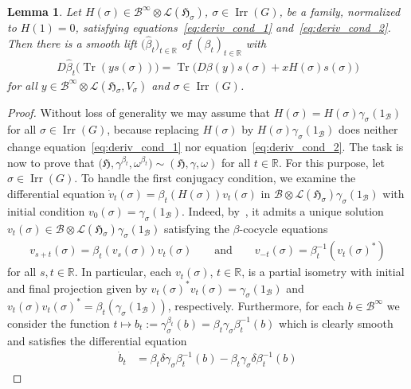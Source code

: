 \documentclass[pdftex]{sigma}
\numberwithin{equation}{section}
\newtheorem{Lemma}[Theorem]{Lemma}
\newcommand*{\R}{\mathbb R}		%
\newcommand*{\tensor}{\otimes}		%
\DeclareMathOperator{\Tr}{Tr}		%
\newcommand*{\hilb}{\mathfrak}		%
\newcommand*{\alg}{\mathcal}		%
\newcommand*{\hH}{\hilb{H}}			%
\newcommand*{\one}{1}				%
\newcommand*{\aB}{\alg{B}} 			%
\newcommand*{\End}{\mathcal{L}} %
\DeclareMathOperator{\Irrep}{Irr} 			%
\begin{document}
\begin{Lemma}\label{lem:H_to_1_param}
	Let $H(\sigma) \in \aB^\infty \tensor \End(\hH_\sigma)$, $\sigma \in \Irrep(G)$, be a family, normalized to $H(1) = 0$, satisfying equations~\eqref{eq:deriv_cond_1} and~\eqref{eq:deriv_cond_2}.
	Then there is a smooth lift $\big(\hat \beta_t\big)_{t \in \R}$ of $(\beta_t)_{t \in \R}$ with
	\begin{gather*}
		D\hat \beta_t \bigl( \Tr ( y s(\sigma) ) \bigr) = \Tr \bigl( D\beta(y) s(\sigma) + x H(\sigma) s(\sigma) \bigr)
	\end{gather*}
	for all $y \in \aB^\infty \tensor \End(\hH_\sigma, V_\sigma)$ and $\sigma \in \Irrep(G)$.
\end{Lemma}
\begin{proof}
	Without loss of generality we may assume that $H(\sigma) = H(\sigma) \gamma_\sigma(\one_\aB)$ for all $\sigma \in \Irrep(G)$, because replacing $H(\sigma)$ by $H(\sigma) \gamma_\sigma(\one_\aB)$ does neither change equation~\eqref{eq:deriv_cond_1} nor equation~\eqref{eq:deriv_cond_2}.
	The task is now to prove that $\big(\hH, \gamma^{\beta_t}, \omega^{\beta_t}\big) \sim (\hH, \gamma, \omega)$ for all $t \in \R$.
	For this purpose, let $\sigma \in \Irrep(G)$.
	To handle the first conjugacy condition, we examine the differential equation $\dot v_t(\sigma) = \beta_t ( H(\sigma) ) v_t(\sigma)$ in $\aB \tensor \End(\hH_\sigma) \gamma_\sigma(\one_\aB)$ with initial condition $v_0(\sigma) = \gamma_\sigma(\one_\aB)$.
	Indeed, by~\cite[Section~3]{daleckii02}, it admits a unique solution $v_t(\sigma) \in \aB \tensor \End(\hH_\sigma) \gamma_\sigma(\one_\aB)$ satisfying the $\beta$-cocycle equations
	\begin{gather}\label{eq:proof_1_cocycle}
		v_{s+t}(\sigma)
		= \beta_t ( v_s(\sigma) ) v_t(\sigma)
		\qquad
		\text{and}
		\qquad
		v_{-t}(\sigma)
		= \beta_t^{-1} ( v_t(\sigma)^* )
	\end{gather}
for all $s, t \in \R$.
	In particular, each $v_t(\sigma)$, $t \in \R$, is a partial isometry with initial and final projection given by $v_t(\sigma)^* v_t(\sigma) = \gamma_\sigma(\one_\aB)$ and $v_t(\sigma) v_t(\sigma)^* = \beta_t ( \gamma_\sigma(\one_\aB) )$, respectively.
	Furthermore, for each $b \in \aB^\infty$ we consider the function $t \mapsto b_t := \gamma^{\beta_t}_\sigma(b) = \beta_t\gamma_\sigma\beta_t^{-1}(b)$ which is clearly smooth and satisfies the differential equation
	\begin{align*}
		\dot b_t
		&
		= \beta_t\delta \gamma_\sigma\beta_t^{-1}(b) - \beta_t\gamma_\sigma\delta \beta_t^{-1}(b)

\end{align*}
\end{proof}
\end{document}
